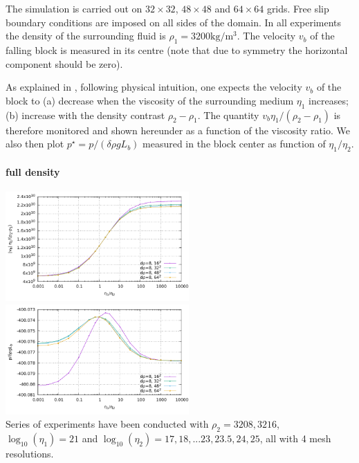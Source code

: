 The simulation is carried out on $32\times32$, $48\times48$ and $64\times 64$ grids. Free slip
boundary conditions are imposed on all sides of the domain. 
In all experiments the density of the surrounding fluid is $\rho_1=3200\text{kg}/\text{m}^3$.
The velocity $v_b$ of the falling block is measured in its centre (note that due to symmetry 
the horizontal component should be zero).

As explained in \cite{thie11}, following physical intuition, one expects 
the velocity $v_b$ of the block to (a) decrease when the viscosity
of the surrounding medium $\eta_1$ increases; (b) increase with the
density contrast $\rho_2-\rho_1$. 
The quantity $v_b \eta_1/(\rho_2-\rho_1)$ is therefore monitored and shown hereunder as a function of 
the viscosity ratio.
We also then plot $p^\star=p/(\delta \rho g L_b)$ measured in the block center 
as function of $\eta_1/\eta_2$. 

\paragraph{full density}

\begin{center}
\includegraphics[width=7cm]{python_codes/fieldstone_53/results/full/results_v.pdf}
\includegraphics[width=7cm]{python_codes/fieldstone_53/results/full/results_p.pdf}\\
{\captionfont
Series of experiments have been conducted with $\rho_2=3208,3216$, 
$\log_{10}(\eta_1)=21$ and $\log_{10}(\eta_2)=17,18,...23,23.5,24,25$, 
all with 4 mesh resolutions.}
 \end{center}

